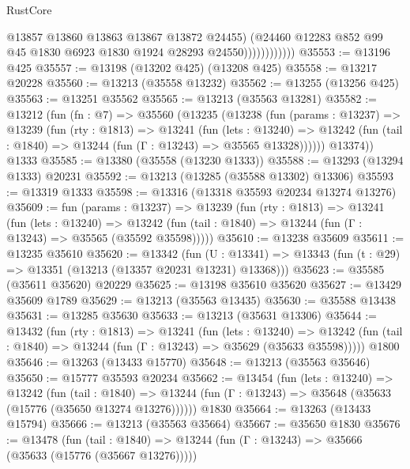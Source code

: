 \begin{lexlean}{RustCore}
\begin{coremodule}
                            @13857
                            @13860
                            @13863
                            @13867
                            @13872
                            @24455)
                          (@24460
                            @12283
                            @852
                            @99
                            @45
                            @1830
                            @6923
                            @1830
                            @1924
                            @28293
                            @24550))))))))))))
@35553 := @13196 @425
@35557 := @13198 (@13202 @425) (@13208 @425)
@35558 := @13217 @20228
@35560 := @13213 (@35558 @13232)
@35562 := @13255 (@13256 @425)
@35563 := @13251 @35562
@35565 := @13213 (@35563 @13281)
@35582 := @13212
    (fun (fn : @7) =>
    @35560
      (@13235
        (@13238
          (fun (params : @13237) =>
          @13239
            (fun (rty : @1813) =>
            @13241
              (fun (lets : @13240) =>
              @13242 (fun (tail : @1840) => @13244 (fun (Γ : @13243) => @35565 @13328))))))
        @13374))
    @1333
@35585 := @13380 (@35558 (@13230 @1333))
@35588 := @13293 (@13294 @1333) @20231
@35592 := @13213 (@13285 (@35588 @13302) @13306)
@35593 := @13319 @1333
@35598 := @13316 (@13318 @35593 @20234 @13274 @13276)
@35609 := fun (params : @13237) =>
  @13239
    (fun (rty : @1813) =>
    @13241
      (fun (lets : @13240) =>
      @13242 (fun (tail : @1840) => @13244 (fun (Γ : @13243) => @35565 (@35592 @35598)))))
@35610 := @13238 @35609
@35611 := @13235 @35610
@35620 := @13342
    (fun (U : @13341) => @13343 (fun (t : @29) => @13351 (@13213 (@13357 @20231 @13231) @13368)))
@35623 := @35585 (@35611 @35620) @20229
@35625 := @13198 @35610 @35620
@35627 := @13429 @35609 @1789
@35629 := @13213 (@35563 @13435)
@35630 := @35588 @13438
@35631 := @13285 @35630
@35633 := @13213 (@35631 @13306)
@35644 := @13432
    (fun (rty : @1813) =>
    @13241
      (fun (lets : @13240) =>
      @13242 (fun (tail : @1840) => @13244 (fun (Γ : @13243) => @35629 (@35633 @35598)))))
    @1800
@35646 := @13263 (@13433 @15770)
@35648 := @13213 (@35563 @35646)
@35650 := @15777 @35593 @20234
@35662 := @13454
    (fun (lets : @13240) =>
    @13242
      (fun (tail : @1840) =>
      @13244 (fun (Γ : @13243) => @35648 (@35633 (@15776 (@35650 @13274 @13276))))))
    @1830
@35664 := @13263 (@13433 @15794)
@35666 := @13213 (@35563 @35664)
@35667 := @35650 @1830
@35676 := @13478
    (fun (tail : @1840) => @13244 (fun (Γ : @13243) => @35666 (@35633 (@15776 (@35667 @13276)))))

\end{coremodule}
\end{lexlean}
